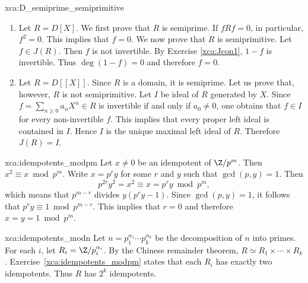 \begin{sol}{xca:D_semiprime_semiprimitive}
\begin{enumerate}
    \item Let $R=D[X]$. We first prove that $R$ is semiprime. If $fRf=0$, in particular, 
    $f^2=0$. This implies that $f=0$. 
    We now prove that $R$ is semiprimitive. Let $f\in J(R)$. Then $f$ is not invertible. By Exercise \ref{xca:Jcon1}, $1-f$ is invertible. Thus $\deg(1-f)=0$ and therefore
    $f=0$. 

    \item Let $R=D[\![X]\!]$. Since $R$ is a domain, 
    it is semiprime. Let us prove that, however, $R$ is not
    semiprimitive. Let $I$ be ideal of $R$ 
    generated by $X$. 
    Since $f=\sum_{n\geq0}a_nX^n\in R$ is invertible if and only 
    if $a_0\ne 0$, one obtains that $f\in I$ for every non-invertible $f$. 
    This implies
    that every proper left ideal is contained in $I$. Hence 
    $I$ is the unique maximal left ideal of $R$. Therefore 
    $J(R)=I$. 
    \end{enumerate}
\end{sol}


\begin{sol}{xca:idempotents_modpm}
    Let $x\ne 0$ be an idempotent of $\Z/p^m$. Then $x^2\equiv x\bmod p^m$. 
    Write $x=p^ry$ for some $r$ and $y$ such that $\gcd(p,y)=1$. Then 
    \[
    p^{2r}y^2=x^2\equiv x=p^ry\bmod p^m,
    \]
    which means that $p^{m-r}$ divides $y(p^ry-1)$. Since 
    $\gcd(p,y)=1$, it follows that 
    $p^ry\equiv 1\bmod p^{m-r}$. This implies that $r=0$ and 
    therefore $x=y=1\bmod p^m$.
\end{sol}

\begin{sol}{xca:idempotents_modn}
    Let $n=p_1^{\alpha_1}\cdots p_k^{\alpha_k}$ be the decomposition 
    of $n$ into primes. For each $i$, let $R_i=\Z/p_i^{\alpha_i}$. By the 
    Chinese remainder theorem, $R\simeq R_1\times\cdots\times R_k$. Exercise~\ref{xca:idempotents_modpm} states that each $R_i$ has exactly  
    two idempotents. Thus $R$ has $2^k$ idempotents. 
\end{sol}

